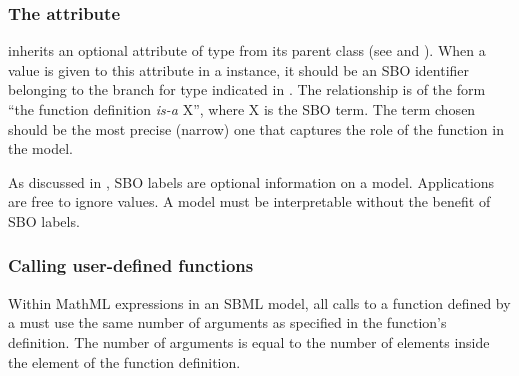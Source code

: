 

\subsubsection{The  attribute}
\label{sec:functiondefinition-sboterm}

\FunctionDefinition inherits an optional 
attribute of type  from its parent
class \SBase (see 
and ).  When a value is given to this
attribute in a \FunctionDefinition instance, it should be an
SBO identifier belonging to the branch for type \FunctionDefinition 
indicated in .  The relationship is
of the form ``the function definition \emph{is-a} X'', where X is
the SBO term.  The term chosen should be the most precise (narrow)
one that captures the role of the function in the model.

As discussed in , SBO labels are optional
information on a model.  Applications are free to ignore
 values.  A model must be interpretable without the
benefit of SBO labels.


\subsubsection{Calling user-defined functions}
\label{sec:functiondefinition-calling}

Within MathML expressions in an SBML model, all calls to a
function defined by a \FunctionDefinition must use the same number
of arguments as specified in the function's definition.  The
number of arguments is equal to the number of 
elements inside the  element of the function
definition.  

